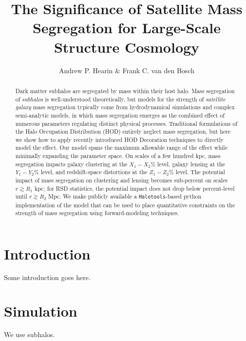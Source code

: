 \documentclass[usenatbib,usegraphicx,letterpaper]{mn2e}
\begin{document}
\title[Forward-Modeling Satellite Mass Segregation]
{The Significance of Satellite Mass Segregation for Large-Scale Structure Cosmology}

\author[Hearin \& van den Bosch]{Andrew P. Hearin \& Frank C. van den Bosch}

\maketitle

\begin{abstract}
Dark matter subhalos are segregated by mass within their host halo. Mass segregation of {\em subhalos} is well-understood theoretically, but models for the strength of {\em satellite galaxy} mass segregation typically come from hydrodynamical simulations and complex semi-analytic models, in which mass segregation emerges as the combined effect of numerous parameters regulating distinct physical processes. Traditional formulations of the Halo Occupation Distribution (HOD) entirely neglect mass segregation, but here we show how to apply recently introduced HOD Decoration techniques to directly model the effect. Our model spans the maximum allowable range of the effect while minimally expanding the parameter space. On scales of a few hundred kpc, mass segregation impacts galaxy clustering at the $X_1-X_2\%$ level, galaxy lensing at the $Y_1-Y_2\%$ level, and redshift-space distortions at the $Z_1-Z_2\%$ level. The potential impact of mass segregation on clustering and lensing becomes sub-percent on scales $r\gtrsim R_1$ kpc; for RSD statistics, the potential impact does not drop below percent-level until $r\gtrsim R_2$ Mpc. We make publicly available a {\tt Halotools}-based python implementation of the model that can be used to place quantitative constraints on the strength of mass segregation using forward-modeling techniques.  

\end{abstract}

\section{Introduction}
Some introduction goes here.

\section{Simulation}
We use  \citet{rockstar} subhalos. 

 

\end{document}

